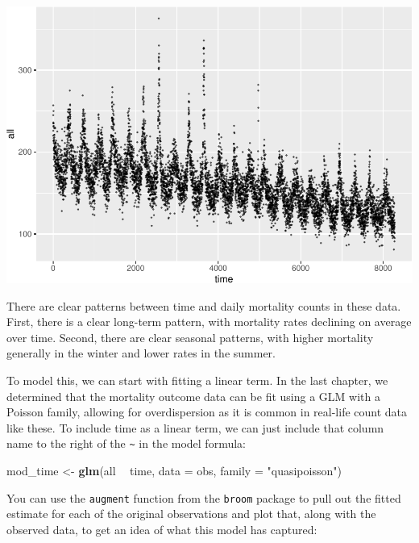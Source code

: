 \documentclass[
]{book}
\newenvironment{Shaded}{\begin{snugshade}}{\end{snugshade}}
\newcommand{\DataTypeTok}[1]{\textcolor[rgb]{0.13,0.29,0.53}{#1}}
\newcommand{\KeywordTok}[1]{\textcolor[rgb]{0.13,0.29,0.53}{\textbf{#1}}}
\newcommand{\NormalTok}[1]{#1}
\newcommand{\OperatorTok}[1]{\textcolor[rgb]{0.81,0.36,0.00}{\textbf{#1}}}
\newcommand{\StringTok}[1]{\textcolor[rgb]{0.31,0.60,0.02}{#1}}
\begin{document}
\includegraphics{adv_epi_analysis_files/figure-latex/unnamed-chunk-44-1.pdf}

There are clear patterns between time and daily mortality counts in these data.
First, there is a clear long-term pattern, with mortality rates declining on
average over time. Second, there are clear seasonal patterns, with higher
mortality generally in the winter and lower rates in the summer.

To model this, we can start with fitting a linear term. In the last chapter,
we determined that the mortality outcome data can be fit using a GLM with a
Poisson family, allowing for overdispersion as it is common in real-life
count data like these. To include time as a linear term, we can just include
that column name to the right of the \texttt{\textasciitilde{}} in the model formula:

\begin{Shaded}
\begin{Highlighting}[]
\NormalTok{mod_time <-}\StringTok{ }\KeywordTok{glm}\NormalTok{(all }\OperatorTok{~}\StringTok{ }\NormalTok{time, }
                \DataTypeTok{data =}\NormalTok{ obs, }\DataTypeTok{family =} \StringTok{"quasipoisson"}\NormalTok{)}
\end{Highlighting}
\end{Shaded}

You can use the \texttt{augment} function from the \texttt{broom} package to pull out the
fitted estimate for each of the original observations and plot that, along
with the observed data, to get an idea of what this model has captured:
\end{document}
